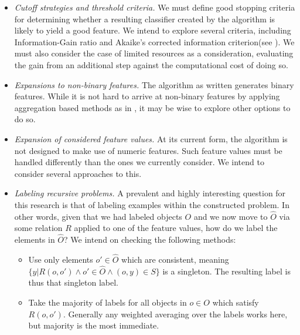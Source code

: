 \documentclass[12pt, a4paper]{article}
\theoremstyle{definition}
\begin{document}
\begin{itemize}
    \item \emph{Cutoff strategies and threshold criteria.} We must define good stopping criteria for determining whether a resulting classifier created by the algorithm is likely to yield a good feature. We intend to explore several criteria, including Information-Gain ratio\citep{quinlan1986} and Akaike's corrected information criterion(see \citet{burnham2002model}). We must also consider the case of limited resources as a consideration, evaluating the gain from an additional step against the computational cost of doing so. %
    \item \emph{Expansions to non-binary features.} The algorithm as written generates binary features. While it is not hard to arrive at non-binary features by applying aggregation based methods as in \citet{popescul2003statistical}, it may be wise to explore other options to do so.
    \item \emph{Expansion of considered feature values.} At its current form, the algorithm is not designed to make use of numeric features. Such feature values must be handled differently than the ones we currently consider. We intend to consider several approaches to this.
    \item \emph{Labeling recursive problems.} A prevalent and highly interesting question for this research is that of labeling examples within the constructed problem. In other words, given that we had labeled objects $O$ and we now move to $\hat{O}$ via some relation $R$ applied to one of the feature values, how do we label the elements in $\hat{O}$? We intend on checking the following methods:
        \begin{itemize}
            \item Use only elements $o'\in \hat{O}$ which are consistent, meaning $\{y|R(o,o')\wedge o'\in \hat{O}\wedge (o,y)\in S\}$ is a singleton. The resulting label is thus that singleton label.
            \item Take the majority of labels for all objects in $o\in O$ which satisfy $R(o,o')$. Generally any weighted averaging over the labels works here, but majority is the most immediate.

\end{itemize}
\end{itemize}
\end{document}

